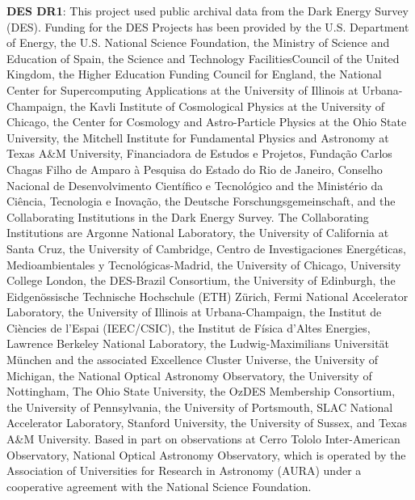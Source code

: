 \documentclass[fleqn,usenatbib]{mnras}
\begin{document}
{\bf DES DR1}: This project used public archival data from the Dark Energy Survey (DES). Funding for the DES Projects has been provided by the U.S. Department of Energy, the U.S. National Science Foundation, the Ministry of Science and Education of Spain, the Science and Technology FacilitiesCouncil of the United Kingdom, the Higher Education Funding Council for England, the National Center for Supercomputing Applications at the University of Illinois at Urbana-Champaign, the Kavli Institute of Cosmological Physics at the University of Chicago, the Center for Cosmology and Astro-Particle Physics at the Ohio State University, the Mitchell Institute for Fundamental Physics and Astronomy at Texas A\&M University, Financiadora de Estudos e Projetos, Funda{\c c}{\~a}o Carlos Chagas Filho de Amparo {\`a} Pesquisa do Estado do Rio de Janeiro, Conselho Nacional de Desenvolvimento Cient{\'i}fico e Tecnol{\'o}gico and the Minist{\'e}rio da Ci{\^e}ncia, Tecnologia e Inova{\c c}{\~a}o, the Deutsche Forschungsgemeinschaft, and the Collaborating Institutions in the Dark Energy Survey.
The Collaborating Institutions are Argonne National Laboratory, the University of California at Santa Cruz, the University of Cambridge, Centro de Investigaciones Energ{\'e}ticas, Medioambientales y Tecnol{\'o}gicas-Madrid, the University of Chicago, University College London, the DES-Brazil Consortium, the University of Edinburgh, the Eidgen{\"o}ssische Technische Hochschule (ETH) Z{\"u}rich,  Fermi National Accelerator Laboratory, the University of Illinois at Urbana-Champaign, the Institut de Ci{\`e}ncies de l'Espai (IEEC/CSIC), the Institut de F{\'i}sica d'Altes Energies, Lawrence Berkeley National Laboratory, the Ludwig-Maximilians Universit{\"a}t M{\"u}nchen and the associated Excellence Cluster Universe, the University of Michigan, the National Optical Astronomy Observatory, the University of Nottingham, The Ohio State University, the OzDES Membership Consortium, the University of Pennsylvania, the University of Portsmouth, SLAC National Accelerator Laboratory, Stanford University, the University of Sussex, and Texas A\&M University.
Based in part on observations at Cerro Tololo Inter-American Observatory, National Optical Astronomy Observatory, which is operated by the Association of Universities for Research in Astronomy (AURA) under a cooperative agreement with the National Science Foundation.\\
\end{document}
